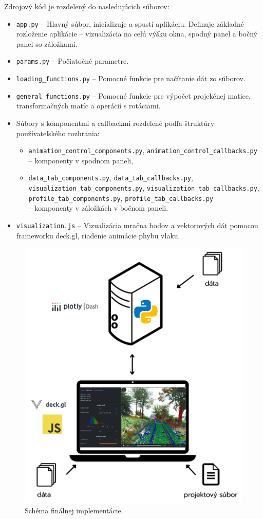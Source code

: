 Zdrojový kód je rozdelený do nasledujúcich súborov:
\begin{itemize}
    \item \texttt{app.py} -- Hlavný súbor, inicializuje a spustí aplikáciu. Definuje základné rozloženie aplikácie -- vizualizácia na celú výšku okna, spodný panel a bočný panel so záložkami.
    \item \texttt{params.py} -- Počiatočné parametre.
    \item \texttt{loading\_functions.py} -- Pomocné funkcie pre načítanie dát zo súborov.
    \item \texttt{general\_functions.py} -- Pomocné funkcie pre výpočet projekčnej matice, transformačných matíc a operácií s rotáciami.
    \item Súbory s komponentmi a callbackmi rozdelené podľa štruktúry používateľského rozhrania:
    \begin{itemize}
        \item \texttt{animation\_control\_components.py}, \texttt{animation\_control\_callbacks.py} \\ -- komponenty v spodnom paneli,
        \item \texttt{data\_tab\_components.py}, \texttt{data\_tab\_callbacks.py}, \\\texttt{visualization\_tab\_components.py}, \texttt{visualization\_tab\_callbacks.py}, \\ \texttt{profile\_tab\_components.py}, \texttt{profile\_tab\_callbacks.py} \\ -- komponenty v záložkách v bočnom paneli.
    \end{itemize}
    \item \texttt{visualization.js} -- Vizualizácia mračna bodov a vektorových dát pomocou frameworku deck.gl, riadenie animácie phybu vlaku.
\end{itemize}

\begin{figure}[h]
    \centering
    \includegraphics[width=0.7\linewidth]{text_prace/obrazky-figures/schema_implementacie.pdf}
    \caption{Schéma finálnej implementácie.}
    \label{fig:schema_implementacie}
\end{figure}

